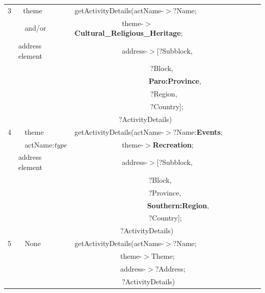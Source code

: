 \documentclass[a4paper,9pt]{beamer}
\begin{document}
{\begin{table} [tbph]
\begin{tabular}{|l|l|l|}
\hline
 3&$~~~$theme & getActivityDetails(actName-$>?$Name;\\
  &$~~~~$and/or      &$~~~~~~~~~~~~~~~~~~~~~~~~~~~~~~$theme-$>$\textbf{{\color{blue}Cultural\_Religious\_Heritage}}; \\
  & address element      &$~~~~~~~~~~~~~~~~~~~~~~~~~~~~~~$address-$>$[?Subblock, \\
  &                       &$~~~~~~~~~~~~~~~~~~~~~~~~~~~~~~~~~~~~~~~~~~~~~~~~?$Block, \\
  &                       &$~~~~~~~~~~~~~~~~~~~~~~~~~~~~~~~~~~~~~~~~~~~~~~~$\textbf{{\color{blue}Paro:Province}},\\
  &                       &$~~~~~~~~~~~~~~~~~~~~~~~~~~~~~~~~~~~~~~~~~~~~~~~~?$Region, \\
  &                       &$~~~~~~~~~~~~~~~~~~~~~~~~~~~~~~~~~~~~~~~~~~~~~~~~?$Country]; \\
  &                 &$~~~~~~~~~~~~~~~~~~~~~~~~~~~~${\color{red}$?$ActivityDetails})\\          
\hline 
 4&$~~~~$theme & getActivityDetails(actName-$>?$Name:\textbf{{\color{blue}Events}};\\
  &$~~~~$actName:\emph{type}&$~~~~~~~~~~~~~~~~~~~~~~~~~~~~~~$theme-$>$\textbf{{\color{blue}Recreation}}; \\
  & address element      &$~~~~~~~~~~~~~~~~~~~~~~~~~~~~~~$address-$>$[?Subblock, \\
  &                       &$~~~~~~~~~~~~~~~~~~~~~~~~~~~~~~~~~~~~~~~~~~~~~~~?$Block, \\
  &                       &$~~~~~~~~~~~~~~~~~~~~~~~~~~~~~~~~~~~~~~~~~~~~~~~?$Province,\\
  &                       &$~~~~~~~~~~~~~~~~~~~~~~~~~~~~~~~~~~~~~~~~~~~~~~$\textbf{{\color{blue}Southern:Region}}, \\
  &                       &$~~~~~~~~~~~~~~~~~~~~~~~~~~~~~~~~~~~~~~~~~~~~~~~?$Country]; \\
  &                 &$~~~~~~~~~~~~~~~~~~~~~~~~~~~~~${\color{red}$?$ActivityDetails})\\        
 \hline
 5&$~~~~$None              & getActivityDetails(actName-$>?$Name;\\
  &    &$~~~~~~~~~~~~~~~~~~~~~~~~~~~~~$theme-$>$Theme; \\
  &       &$~~~~~~~~~~~~~~~~~~~~~~~~~~~~~$address-$>?$Address; \\
  &      &$~~~~~~~~~~~~~~~~~~~~~~~~~~~~~~${\color{red}$?$ActivityDetails})\\ 
\hline 
\end{tabular} 
\end{table}
}
\end{document}
